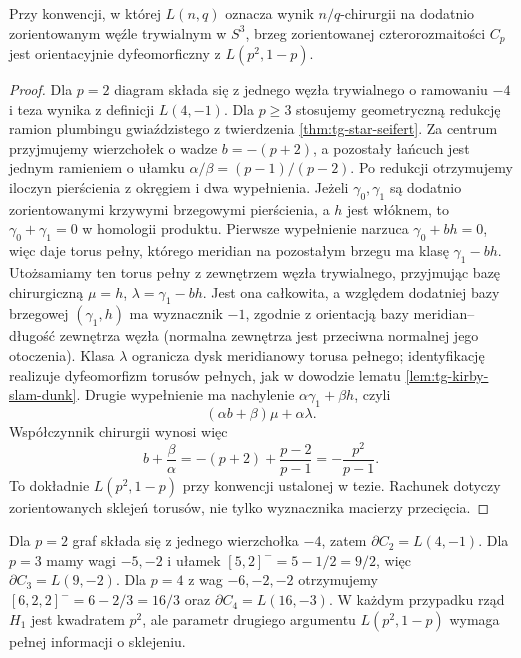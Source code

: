 \begin{twierdzenie}
\label{thm:tg-rb-lens}
Przy konwencji, w której $L(n,q)$ oznacza wynik
$n/q$-chirurgii na dodatnio zorientowanym węźle
trywialnym w $S^3$, brzeg zorientowanej
czterorozmaitości $C_p$ jest orientacyjnie
dyfeomorficzny z $L(p^2,1-p)$.
\end{twierdzenie}

\begin{proof}
Dla $p=2$ diagram składa się z jednego
węzła trywialnego o ramowaniu $-4$ i teza
wynika z definicji $L(4,-1)$.
Dla $p\ge3$ stosujemy geometryczną redukcję
ramion plumbingu gwiaździstego z twierdzenia
\ref{thm:tg-star-seifert}.
Za centrum przyjmujemy wierzchołek o wadze
$b=-(p+2)$, a pozostały łańcuch jest jednym
ramieniem o ułamku $\alpha/\beta=(p-1)/(p-2)$.
Po redukcji otrzymujemy iloczyn pierścienia
z okręgiem i dwa wypełnienia. Jeżeli $\gamma_0,\gamma_1$
są dodatnio zorientowanymi krzywymi brzegowymi
pierścienia, a $h$ jest włóknem, to
$\gamma_0+\gamma_1=0$ w homologii produktu.
Pierwsze wypełnienie narzuca
$\gamma_0+bh=0$, więc daje torus pełny,
którego meridian na pozostałym brzegu ma klasę
$\gamma_1-bh$. Utożsamiamy ten torus pełny
z zewnętrzem węzła trywialnego, przyjmując
bazę chirurgiczną $\mu=h$, $\lambda=\gamma_1-bh$.
Jest ona całkowita, a względem dodatniej bazy
brzegowej $(\gamma_1,h)$ ma wyznacznik $-1$,
zgodnie z orientacją bazy meridian--długość
zewnętrza węzła (normalna zewnętrza jest
przeciwna normalnej jego otoczenia).
Klasa $\lambda$ ogranicza dysk meridianowy
torusa pełnego; identyfikację realizuje
dyfeomorfizm torusów pełnych, jak w dowodzie
lematu \ref{lem:tg-kirby-slam-dunk}.
Drugie wypełnienie ma nachylenie
$\alpha\gamma_1+\beta h$, czyli
\[
(\alpha b+\beta)\mu+\alpha\lambda.
\]
Współczynnik chirurgii wynosi więc
\[
b+\frac{\beta}{\alpha}
=-(p+2)+\frac{p-2}{p-1}
=-\frac{p^2}{p-1}.
\]
To dokładnie $L(p^2,1-p)$ przy konwencji
ustalonej w tezie. Rachunek dotyczy
zorientowanych sklejeń torusów, nie tylko
wyznacznika macierzy przecięcia.
\end{proof}

\begin{przyklad}[Przypadki $p=2,3,4$]
Dla $p=2$ graf składa się z jednego wierzchołka
$-4$, zatem $\partial C_2=L(4,-1)$.
Dla $p=3$ mamy wagi $-5,-2$ i ułamek
$[5,2]^-=5-1/2=9/2$, więc
$\partial C_3=L(9,-2)$.
Dla $p=4$ z wag $-6,-2,-2$ otrzymujemy
$[6,2,2]^-=6-2/3=16/3$ oraz
$\partial C_4=L(16,-3)$.
W każdym przypadku rząd $H_1$ jest kwadratem $p^2$,
ale parametr drugiego argumentu $L(p^2,1-p)$
wymaga pełnej informacji o sklejeniu.
\end{przyklad}

